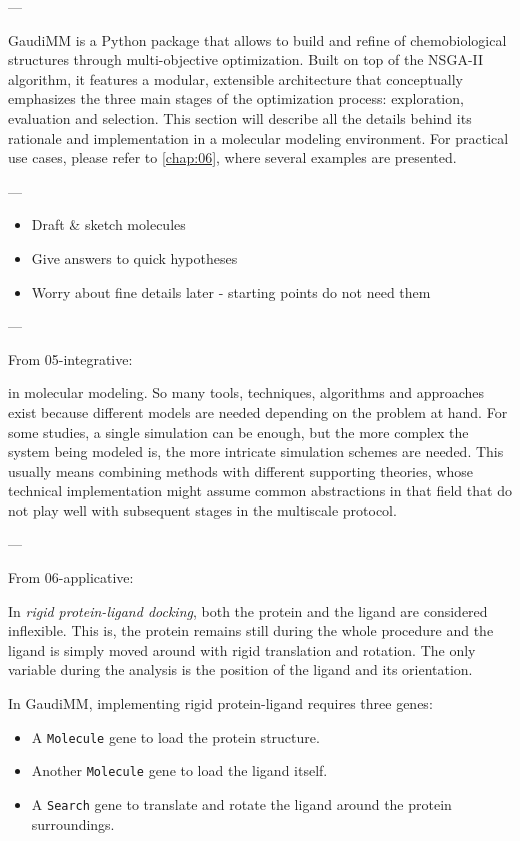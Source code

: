 ---

GaudiMM is a Python package that allows to build and refine of chemobiological structures through multi-objective optimization. Built on top of the NSGA-II algorithm, it features a modular, extensible architecture that conceptually emphasizes the three main stages of the optimization process: exploration, evaluation and selection. This section will describe all the details behind its rationale and implementation in a molecular modeling environment. For practical use cases, please refer to \autoref{chap:06}, where several examples are presented.

---

\begin{itemize}
	\item Draft \& sketch molecules
	\item Give answers to quick hypotheses
	\item Worry about fine details later - starting points do not need them
\end{itemize}

---

From 05-integrative:

 in molecular modeling. So many tools, techniques, algorithms and approaches exist because different models are needed depending on the problem at hand. For some studies, a single simulation can be enough, but the more complex the system being modeled is, the more intricate simulation schemes are needed. This usually means combining methods with different supporting theories, whose technical implementation might assume common abstractions in that field that do not play well with subsequent stages in the multiscale protocol.

---

From 06-applicative:

In \textit{rigid protein-ligand docking}, both the protein and the ligand are considered inflexible. This is, the protein remains still during the whole procedure and the ligand is simply moved around with rigid translation and rotation. The only variable during the analysis is the position of the ligand and its orientation.

In GaudiMM, implementing rigid protein-ligand requires three genes:

\begin{itemize}
	\item A \texttt{Molecule} gene to load the protein structure.
	\item Another \texttt{Molecule} gene to load the ligand itself.
	\item A \texttt{Search} gene to translate and rotate the ligand around the protein surroundings.
\end{itemize}

